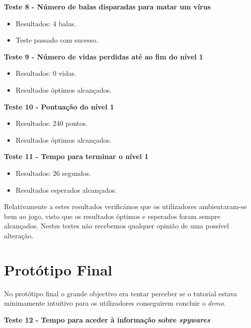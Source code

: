 \textbf{Teste 8 - Número de balas disparadas para matar um vírus}

\begin{itemize}

\item Resultados: 4 balas.

\item Teste passado com sucesso.
\end{itemize}

\textbf{Teste 9 - Número de vidas perdidas até ao fim do nível 1}

\begin{itemize}

\item Resultados: 0 vidas.

\item Resultados óptimos alcançados.
\end{itemize}

\textbf{Teste 10 - Pontuação do nível 1}

\begin{itemize}

\item Resultados: 240 pontos.

\item Resultados óptimos alcançados.
\end{itemize}

\textbf{Teste 11 - Tempo para terminar o nível 1}

\begin{itemize}

\item Resultados: 26 segundos.

\item Resultados esperados alcançados.
\end{itemize}

Relativamente a estes resultados verificámos que os utilizadores ambientaram-se bem ao jogo, visto que os resultados óptimos e esperados foram sempre alcançados. Nestes testes não recebemos qualquer opinião de uma possível alteração.

\section{Protótipo Final}
No protótipo final o grande objectivo era tentar perceber se o tutorial estava minimamente intuitivo para os utilizadores conseguirem concluir o \textit{demo}.

\textbf{Teste 12 - Tempo para aceder à informação sobre \textit{spywares}}

